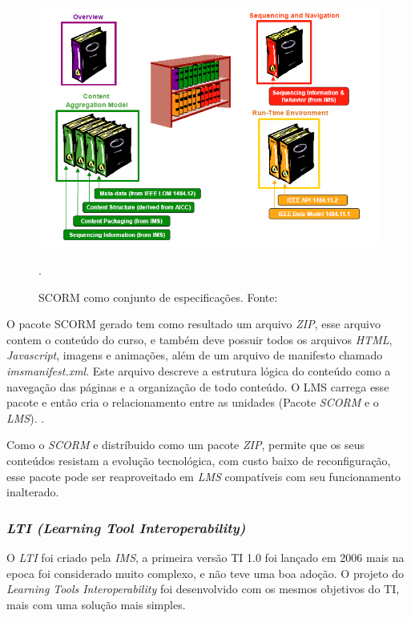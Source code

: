 \begin{figure}[h]
  \centering
  \label{fig:scorm-funcionamento-dutra}
  \includegraphics[keepaspectratio=true,scale=0.7]{figuras/scorm-funcionamento-dutra.png}
  \caption{SCORM como conjunto de especificações. Fonte: }.
\end{figure}

O pacote \ac{SCORM} gerado tem como resultado um arquivo \textit{ZIP}, esse arquivo contem o conteúdo do curso, e também deve possuir todos os arquivos \textit{HTML}, \textit{Javascript}, imagens e animações, além de um arquivo de manifesto chamado \textit{imsmanifest.xml}. Este arquivo descreve a estrutura lógica do conteúdo como a navegação das páginas e a organização de todo conteúdo. O \ac{LMS} carrega esse pacote e então cria o relacionamento entre as unidades (Pacote \textit{SCORM} e o \textit{LMS}). \cite[p.~39]{fernandes-scorm}.

Como o \textit{SCORM} e distríbuido como um pacote \textit{ZIP}, permite que os seus conteúdos resistam a evolução tecnológica, com custo baixo de reconfiguração, esse pacote pode ser reaproveitado em \textit{LMS} compatíveis com seu funcionamento inalterado.

\subsubsection{\textit{LTI (Learning Tool Interoperability)}}
O \textit{LTI} foi criado pela \textit{IMS}, a primeira versão TI 1.0 foi lançado em 2006 mais na epoca foi considerado muito complexo, e não teve uma boa adoção. O projeto do \textit{Learning Tools Interoperability} foi desenvolvido com os mesmos objetivos do TI, mais com uma solução mais simples. \cite{ims}


